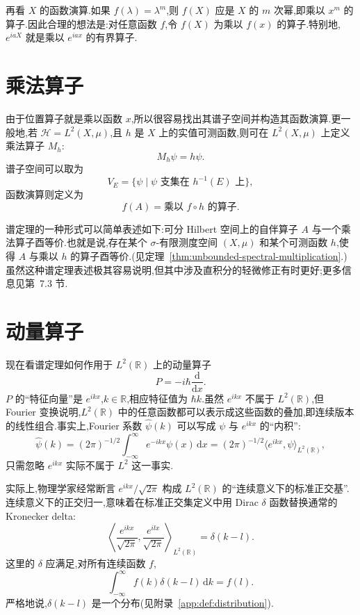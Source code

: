 再看 \(X\) 的函数演算.如果 \(f(\lambda)=\lambda^{m}\),则 \(f(X)\) 应是 \(X\) 的 \(m\) 次幂,即乘以 \(x^{m}\) 的算子.因此合理的想法是:对任意函数 \(f\),令 \(f(X)\) 为乘以 \(f(x)\) 的算子.特别地,\(e^{iaX}\) 就是乘以 \(e^{iax}\) 的有界算子.

\section{乘法算子}\label{sec:multiplication-operators}

由于位置算子就是乘以函数 \(x\),所以很容易找出其谱子空间并构造其函数演算.更一般地,若 \(\mathcal{H}=L^{2}(X,\mu)\),且 \(h\) 是 \(X\) 上的实值可测函数,则可在 \(L^{2}(X,\mu)\) 上定义乘法算子 \(M_{h}\):
\[
M_{h}\psi=h\psi.
\]
谱子空间可以取为
\[
V_{E}=\{\psi\mid\psi\text{ 支集在 }h^{-1}(E)\text{ 上}\},
\]
函数演算则定义为
\[
f(A)=\text{乘以 }f\circ h\text{ 的算子}.
\]

谱定理的一种形式可以简单表述如下:可分 Hilbert 空间上的自伴算子 \(A\) 与一个乘法算子酉等价.也就是说,存在某个 \(\sigma\)-有限测度空间 \((X,\mu)\) 和某个可测函数 \(h\),使得 \(A\) 与乘以 \(h\) 的算子酉等价.(见定理~\ref{thm:unbounded-spectral-multiplication}.)虽然这种谱定理表述极其容易说明,但其中涉及直积分的轻微修正有时更好;更多信息见第~7.3 节.

\section{动量算子}\label{sec:momentum-spectral-example}

现在看谱定理如何作用于 \(L^{2}(\mathbb{R})\) 上的动量算子
\[
P=-i\hbar\frac{\mathrm{d}}{\mathrm{d}x}.
\]
\(P\) 的“特征向量”是 \(e^{ikx}\),\(k\in\mathbb{R}\),相应特征值为 \(\hbar k\).虽然 \(e^{ikx}\) 不属于 \(L^{2}(\mathbb{R})\),但 Fourier 变换说明,\(L^{2}(\mathbb{R})\) 中的任意函数都可以表示成这些函数的叠加,即连续版本的线性组合.事实上,Fourier 系数 \(\widehat\psi(k)\) 可以写成 \(\psi\) 与 \(e^{ikx}\) 的“内积”:
\[
\widehat\psi(k)
=(2\pi)^{-1/2}\int_{-\infty}^{\infty}e^{-ikx}\psi(x)\,\mathrm{d}x
=(2\pi)^{-1/2}\langle e^{ikx},\psi\rangle_{L^{2}(\mathbb{R})},
\]
只需忽略 \(e^{ikx}\) 实际不属于 \(L^{2}\) 这一事实.

实际上,物理学家经常断言 \(e^{ikx}/\sqrt{2\pi}\) 构成 \(L^{2}(\mathbb{R})\) 的“连续意义下的标准正交基”.连续意义下的正交归一,意味着在标准正交集定义中用 Dirac \(\delta\) 函数替换通常的 Kronecker delta:
\begin{equation}
\left\langle\frac{e^{ikx}}{\sqrt{2\pi}},\frac{e^{ilx}}{\sqrt{2\pi}}\right\rangle_{L^{2}(\mathbb{R})}
=\delta(k-l).
\label{eq:continuous-orthogonality}
\end{equation}
这里的 \(\delta\) 应满足,对所有连续函数 \(f\),
\[
\int_{-\infty}^{\infty}f(k)\delta(k-l)\,\mathrm{d}k=f(l).
\]
严格地说,\(\delta(k-l)\) 是一个分布(见附录~\ref{app:def:distribution}).

